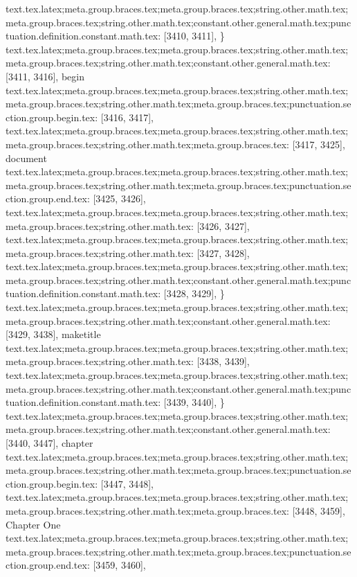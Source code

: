 {{{{{{{{{{{{{{{{{{{{{{{{{{{{{{{{{{{{{{{{{{{{{{{{{{{{{{{{{{{{{{{{{{{{{{{{{{{{{{{{{{{{{{{{{{{{{{{{{{{{{{}
text.tex.latex;meta.group.braces.tex;meta.group.braces.tex;string.other.math.tex;meta.group.braces.tex;string.other.math.tex;constant.other.general.math.tex;punctuation.definition.constant.math.tex: [3410, 3411], {\}
text.tex.latex;meta.group.braces.tex;meta.group.braces.tex;string.other.math.tex;meta.group.braces.tex;string.other.math.tex;constant.other.general.math.tex: [3411, 3416], {begin}
text.tex.latex;meta.group.braces.tex;meta.group.braces.tex;string.other.math.tex;meta.group.braces.tex;string.other.math.tex;meta.group.braces.tex;punctuation.section.group.begin.tex: [3416, 3417], {{}
text.tex.latex;meta.group.braces.tex;meta.group.braces.tex;string.other.math.tex;meta.group.braces.tex;string.other.math.tex;meta.group.braces.tex: [3417, 3425], {document}
text.tex.latex;meta.group.braces.tex;meta.group.braces.tex;string.other.math.tex;meta.group.braces.tex;string.other.math.tex;meta.group.braces.tex;punctuation.section.group.end.tex: [3425, 3426], {}}
text.tex.latex;meta.group.braces.tex;meta.group.braces.tex;string.other.math.tex;meta.group.braces.tex;string.other.math.tex: [3426, 3427], {
}
text.tex.latex;meta.group.braces.tex;meta.group.braces.tex;string.other.math.tex;meta.group.braces.tex;string.other.math.tex: [3427, 3428], {
}
text.tex.latex;meta.group.braces.tex;meta.group.braces.tex;string.other.math.tex;meta.group.braces.tex;string.other.math.tex;constant.other.general.math.tex;punctuation.definition.constant.math.tex: [3428, 3429], {\}
text.tex.latex;meta.group.braces.tex;meta.group.braces.tex;string.other.math.tex;meta.group.braces.tex;string.other.math.tex;constant.other.general.math.tex: [3429, 3438], {maketitle}
text.tex.latex;meta.group.braces.tex;meta.group.braces.tex;string.other.math.tex;meta.group.braces.tex;string.other.math.tex: [3438, 3439], {
}
text.tex.latex;meta.group.braces.tex;meta.group.braces.tex;string.other.math.tex;meta.group.braces.tex;string.other.math.tex;constant.other.general.math.tex;punctuation.definition.constant.math.tex: [3439, 3440], {\}
text.tex.latex;meta.group.braces.tex;meta.group.braces.tex;string.other.math.tex;meta.group.braces.tex;string.other.math.tex;constant.other.general.math.tex: [3440, 3447], {chapter}
text.tex.latex;meta.group.braces.tex;meta.group.braces.tex;string.other.math.tex;meta.group.braces.tex;string.other.math.tex;meta.group.braces.tex;punctuation.section.group.begin.tex: [3447, 3448], {{}
text.tex.latex;meta.group.braces.tex;meta.group.braces.tex;string.other.math.tex;meta.group.braces.tex;string.other.math.tex;meta.group.braces.tex: [3448, 3459], {Chapter One}
text.tex.latex;meta.group.braces.tex;meta.group.braces.tex;string.other.math.tex;meta.group.braces.tex;string.other.math.tex;meta.group.braces.tex;punctuation.section.group.end.tex: [3459, 3460], {}}
}}}}}}}}}}}}}}}}}}}}}}}}}}}}}}}}}}}}}}}}}}}}}}}}}}}}}}}}}}}}}}}}}}}}}}}}}}}}}}}}}}}}}}}}}}}}}}}}}}}}}}}}
